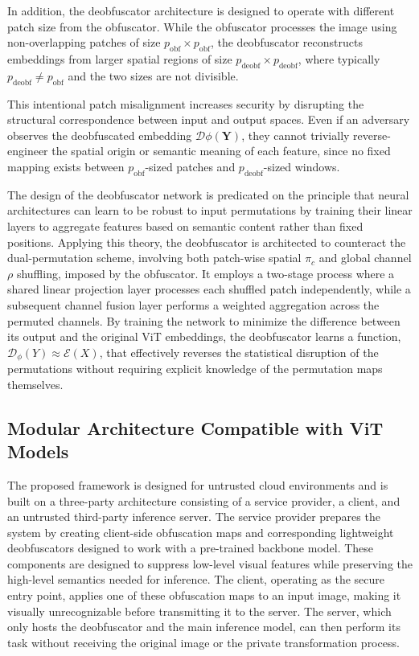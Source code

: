 \documentclass{ieeeaccess}
\newcommand{\rev}[1]{{\color{green}#1}}
\begin{document}
In addition, the deobfuscator architecture is designed to operate with different patch size from the obfuscator. While the obfuscator processes the image using non-overlapping patches of size $p_{\text{obf}} \times p_{\text{obf}}$, the deobfuscator reconstructs embeddings from larger spatial regions of size $p_{\text{deobf}} \times p_{\text{deobf}}$, where typically $p_{\text{deobf}} \neq p_{\text{obf}}$ and the two sizes are not divisible.

This intentional patch misalignment increases security by disrupting the structural correspondence between input and output spaces. Even if an adversary observes the deobfuscated embedding $\mathcal{D}\phi(\mathbf{Y})$, they cannot trivially reverse-engineer the spatial origin or semantic meaning of each feature, since no fixed mapping exists between $p_{\text{obf}}$-sized patches and $p_{\text{deobf}}$-sized windows.

{The design of the deobfuscator network is predicated on the principle that neural architectures can learn to be robust to input permutations by training their linear layers to aggregate features based on semantic content rather than fixed positions. Applying this theory, the deobfuscator is architected to counteract the dual-permutation scheme, involving both patch-wise spatial $\pi_c$ and global channel $\rho$ shuffling, imposed by the obfuscator. It employs a two-stage process where a shared linear projection layer processes each shuffled patch independently, while a subsequent channel fusion layer performs a weighted aggregation across the permuted channels. By training the network to minimize the difference between its output and the original ViT embeddings, the deobfuscator learns a function, $\mathcal{D}_{\phi}(Y) \approx \mathcal{E}(X)$, that effectively reverses the statistical disruption of the permutations without requiring explicit knowledge of the permutation maps themselves.}


\subsection{Modular Architecture Compatible with ViT Models}\label{sec:pro:modular}

\rev{The proposed framework is designed for untrusted cloud environments and is built on a three-party architecture consisting of a service provider, a client, and an untrusted third-party inference server. The service provider prepares the system by creating client-side obfuscation maps and corresponding lightweight deobfuscators designed to work with a pre-trained backbone model. These components are designed to suppress low-level visual features while preserving the high-level semantics needed for inference. The client, operating as the secure entry point, applies one of these obfuscation maps to an input image, making it visually unrecognizable before transmitting it to the server. The server, which only hosts the deobfuscator and the main inference model, can then perform its task without receiving the original image or the private transformation process.}
\end{document}
